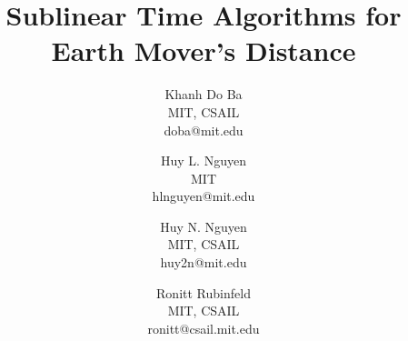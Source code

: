\documentclass[11pt]{article}
\title{Sublinear Time Algorithms for Earth Mover's Distance}
\author{Khanh Do Ba\\MIT, CSAIL\\doba@mit.edu \and 
Huy L. Nguyen\\MIT\\hlnguyen@mit.edu \and
Huy N. Nguyen\\MIT, CSAIL\\huy2n@mit.edu \and
Ronitt Rubinfeld\\MIT, CSAIL\\ronitt@csail.mit.edu}
\begin{document}

\setlength{\oddsidemargin}{.25in}
\setlength{\evensidemargin}{.25in}
\setlength{\textwidth}{6in}
\setlength{\topmargin}{-0.4in}
\setlength{\textheight}{8.5in}

\newcommand{\handout}[5]{
\noindent
   \begin{center}
   \framebox{
      \vbox{
    \hbox to 5.78in { {\bf 6.896 Sublinear Time Algorithms}
     	 \hfill #2 }
       \vspace{4mm}
       \hbox to 5.78in { {\Large \hfill #5  \hfill} }
       \vspace{2mm}
       \hbox to 5.78in { {\it #3 \hfill #4} }
      }
   }
   \end{center}
   \vspace*{4mm}
}

\newcommand{\lecture}[4]{\handout{#1}{#2}{Lecturer:
#3}{Scribe: #4}{Lecture #1}}


\newtheorem{theorem}{Theorem}
\newtheorem{corollary}[theorem]{Corollary}
\newtheorem{lemma}[theorem]{Lemma}
\newtheorem{observation}[theorem]{Observation}
\newtheorem{proposition}[theorem]{Proposition}
\newtheorem{definition}[theorem]{Definition}
\newtheorem{claim}[theorem]{Claim}
\newtheorem{fact}[theorem]{Fact}
\newtheorem{assumption}[theorem]{Assumption}

\newcommand{\qed}{\rule{7pt}{7pt}}
\newcommand{\dis}{\mathop{\mbox{\rm d}}\nolimits}
\newcommand{\per}{\mathop{\mbox{\rm per}}\nolimits}
\newcommand{\area}{\mathop{\mbox{\rm area}}\nolimits}
\newcommand{\cw}{\mathop{\rm cw}\nolimits}
\newcommand{\ccw}{\mathop{\rm ccw}\nolimits}
\newcommand{\DIST}{\mathop{\mbox{\rm DIST}}\nolimits}
\newcommand{\OP}{\mathop{\mbox{\it OP}}\nolimits}
\newcommand{\OPprime}{\mathop{\mbox{\it OP}^{\,\prime}}\nolimits}
\newcommand{\ihat}{\hat{\imath}}
\newcommand{\jhat}{\hat{\jmath}}
\newcommand{\abs}[1]{\mathify{\left| #1 \right|}}

\newenvironment{proof}{\noindent{\bf Proof}\hspace*{1em}}{\qed\bigskip}
\newenvironment{proof-sketch}{\noindent{\bf Sketch of Proof}\hspace*{1em}}{\qed\bigskip}
\newenvironment{proof-idea}{\noindent{\bf Proof Idea}\hspace*{1em}}{\qed\bigskip}
\newenvironment{proof-of-lemma}[1]{\noindent{\bf Proof of Lemma #1}\hspace*{1em}}{\qed\bigskip}
\newenvironment{proof-attempt}{\noindent{\bf Proof Attempt}\hspace*{1em}}{\qed\bigskip}
\newenvironment{proofof}[1]{\noindent{\bf Proof}
of #1:\hspace*{1em}}{\qed\bigskip}
\newenvironment{remark}{\noindent{\bf Remark}\hspace*{1em}}{\bigskip}
\end{document}
